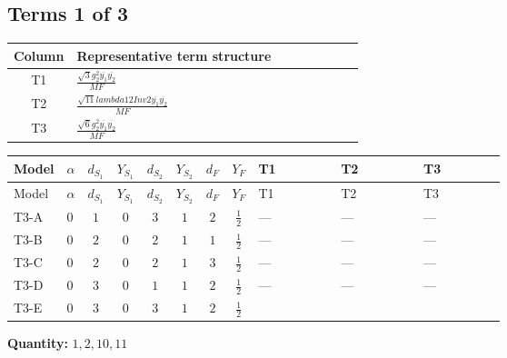 \documentclass[8pt]{article}
\begin{document}
\begin{landscape}
\subsection*{Terms 1 of 3}
\begin{center}
\begin{tabular}{@{}c >{\raggedright\arraybackslash}p{0.82\linewidth}@{}}
\toprule
Column & Representative term structure \\
\midrule
T1 & \(\displaystyle \frac{\sqrt{3} g_{2}^{2} \overline{y_{1}} \overline{y_{2}}}{MF}\) \\
\midrule
T2 & \(\displaystyle \frac{\sqrt{11} lambda12Inv2 \overline{y_{1}} \overline{y_{2}}}{MF}\) \\
\midrule
T3 & \(\displaystyle \frac{\sqrt{6} g_{2}^{2} \overline{y_{1}} \overline{y_{2}}}{MF}\) \\
\midrule
\bottomrule
\end{tabular}
\end{center}
\smallskip
\tiny
\begin{longtable}{@{}llcccccc >{\raggedright\arraybackslash}p{0.21\linewidth} >{\raggedright\arraybackslash}p{0.21\linewidth} >{\raggedright\arraybackslash}p{0.21\linewidth}@{}}
\toprule
Model & $\alpha$ & $d_{S_1}$ & $Y_{S_1}$ & $d_{S_2}$ & $Y_{S_2}$ & $d_F$ & $Y_F$ & T1 & T2 & T3 \\
\midrule
\endfirsthead
\toprule
Model & $\alpha$ & $d_{S_1}$ & $Y_{S_1}$ & $d_{S_2}$ & $Y_{S_2}$ & $d_F$ & $Y_F$ & T1 & T2 & T3 \\
\midrule
\endhead
T3-A & $0$ & $1$ & $0$ & $3$ & $1$ & $2$ & $\frac{1}{2}$ & --- & --- & --- \\
\midrule
T3-B & $0$ & $2$ & $0$ & $2$ & $1$ & $1$ & $\frac{1}{2}$ & --- & --- & --- \\
\midrule
T3-C & $0$ & $2$ & $0$ & $2$ & $1$ & $3$ & $\frac{1}{2}$ & --- & --- & --- \\
\midrule
T3-D & $0$ & $3$ & $0$ & $1$ & $1$ & $2$ & $\frac{1}{2}$ & --- & --- & --- \\
\midrule
T3-E & $0$ & $3$ & $0$ & $3$ & $1$ & $2$ & $\frac{1}{2}$ & \scriptsize\adjustbox{max width=\linewidth}{$\begin{gathered} - \frac{15 \sqrt{3} g_{2}^{2} \overline{y_{1}} \overline{y_{2}}}{8 MF}\end{gathered}$} & \scriptsize\adjustbox{max width=\linewidth}{$\begin{gathered} - \frac{3 \sqrt{11} lambda12Inv2 \overline{y_{1}} \overline{y_{2}}}{22 MF}\end{gathered}$} & \scriptsize\adjustbox{max width=\linewidth}{$\begin{gathered} - \frac{\sqrt{6} g_{2}^{2} \overline{y_{1}} \overline{y_{2}}}{6 MF}\end{gathered}$} \\
\midrule
\bottomrule
\end{longtable}
\clearpage
\noindent\textbf{Quantity: }$\mathrm{1,2,10,11}$\par\smallskip

\end{landscape}
\end{document}
